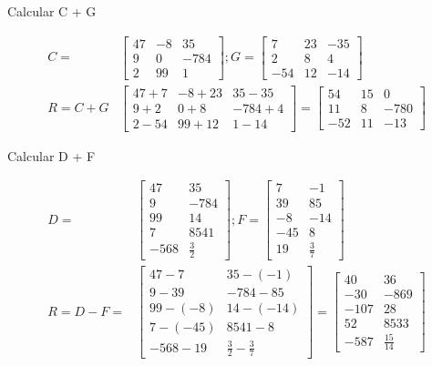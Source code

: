 Calcular C + G

\begin{align*}
    C =
    &\begin{bmatrix}
        47 & -8 & 35\\
        9 & 0 & -784 \\
        2 & 99 & 1
    \end{bmatrix}
    ; G=
    \begin{bmatrix}
        7 & 23 & -35\\
        2 & 8 & 4 \\
        -54 & 12 & -14
    \end{bmatrix}\\
    R = C+G
    &\begin{bmatrix}
        47+7 & -8+23 & 35-35\\
        9+2 & 0+8 & -784+4 \\
        2-54 & 99+12 & 1-14
    \end{bmatrix}
    =
    \begin{bmatrix}
        54 & 15 & 0\\
        11 & 8 & -780 \\
        -52 & 11 & -13
    \end{bmatrix}
\end{align*}

Calcular D + F

\begin{align*}
    D =
    &\begin{bmatrix}
        47 &  35\\
        9  & -784 \\
        99 & 14\\
        7 & 8541 \\
        -568 & \frac{3}{2}
    \end{bmatrix}
    ; F=
    \begin{bmatrix}
        7 &  -1\\
        39  & 85 \\
        -8 & -14\\
        -45 & 8 \\
        19 & \frac{3}{7}
    \end{bmatrix}\\
    R = D-F =
    &\begin{bmatrix}
        47-7 &  35-(-1)\\
        9-39  & -784-85 \\
        99-(-8) & 14-(-14)\\
        7-(-45) & 8541-8 \\
        -568-19 & \frac{3}{2}-\frac{3}{7}
    \end{bmatrix}
    =
    \begin{bmatrix}
        40 &  36\\
        -30  & -869 \\
        -107 & 28\\
        52 & 8533 \\
        -587 & \frac{15}{14}
    \end{bmatrix}
\end{align*}



